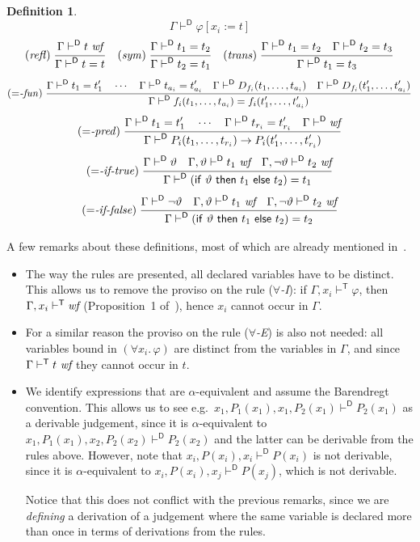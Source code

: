 \documentclass{article}
\newtheorem{definition}{Definition}[section]
\newcommand{\ifthelse}[3]{\ensuremath{\mathsf{if}\ {#1}\ \mathsf{then}\ {#2}\ \mathsf{else}\ {#3}}}
\newcommand{\ok}{\mbox{\em wf}}
\newcommand{\wf}{\ \mbox{\em wf}}
\newcommand{\myvdash}[1]{\ensuremath{\vdash^{\mathsf{#1}}}}
\def\namerule#1{({\it #1\/})}
\def\rulexn#1#2#3{\makebox[0pt][r]{\hss\namerule{#1}$\;\;$}\frac{\displaystyle\strut #2}{\displaystyle\strut #3}}
\def\rulexn#1#2#3{\mbox{\namerule{#1}}\;\frac{\displaystyle\strut #2}{\displaystyle\strut #3}}
\def\sep{.\,}
\begin{document}
\begin{definition}
$$   {\Gamma\myvdash{D}\varphi[x_i:=t]}$$
$$\rulexn{refl}{\Gamma\myvdash{D}t\wf}{\Gamma\myvdash{D}t=t}
\quad
\rulexn{sym}{\Gamma\myvdash{D}t_1=t_2}{\Gamma\myvdash{D}t_2=t_1}
\quad
\rulexn{trans}{\Gamma\myvdash{D}t_1=t_2 \quad \Gamma\myvdash{D}t_2=t_3}
              {\Gamma\myvdash{D}t_1=t_3}$$
$$\rulexn{$=$-fun}
   {\Gamma\myvdash{D}t_1=t'_1 \quad \cdots \quad
    \Gamma\myvdash{D}t_{a_i}=t'_{a_i} \quad
    \Gamma\myvdash{D}D_{f_i}(t_1,\ldots,t_{a_i}) \quad 
    \Gamma\myvdash{D}D_{f_i}(t'_1,\ldots,t'_{a_i})}
   {\Gamma\myvdash{D}f_i(t_1,\ldots,t_{a_i})=f_i(t'_1,\ldots,t'_{a_i})}$$
$$\rulexn{$=$-pred}
   {\Gamma\myvdash{D}t_1=t'_1\quad\cdots\quad\Gamma\myvdash{D}t_{r_i}=t'_{r_i}
                             \quad \Gamma\myvdash{D}\ok}
   {\Gamma\myvdash{D}P_i(t_1,\ldots, t_{r_i}) \to P_i(t'_1,\ldots, t'_{r_i})}$$
$$\rulexn{$=$-if-true}
   {\Gamma\myvdash{D}\vartheta \quad \Gamma,\vartheta\myvdash{D}t_1\wf
                          \quad \Gamma,\neg\vartheta\myvdash{D}t_2\wf}
   {\Gamma\myvdash{D}(\ifthelse\vartheta{t_1}{t_2})=t_1}$$
$$\rulexn{$=$-if-false}
   {\Gamma\myvdash{D}\neg\vartheta \quad \Gamma,\vartheta\myvdash{D}t_1\wf
                              \quad \Gamma,\neg\vartheta\myvdash{D}t_2\wf}
   {\Gamma\myvdash{D}(\ifthelse\vartheta{t_1}{t_2})=t_2}$$
\end{definition}

\bigskip\noindent
A few remarks about these definitions, most of which are already mentioned
in~\cite{wie:zwa:03}.
\begin{itemize}
\item The way the rules are presented, all declared variables have to
be distinct.  This allows us to remove the proviso on the rule
(\emph{$\forall$-I}): if $\Gamma,x_i\myvdash{T}\varphi$, then
$\Gamma,x_i\myvdash{T}\ok$ (Proposition~1 of~\cite{wie:zwa:03}),
hence $x_i$ cannot occur in $\Gamma$.
\item For a similar reason the proviso on the rule (\emph{$\forall$-E})
is also not needed: all variables bound in $(\forall x_i\sep\varphi)$
are distinct from the variables in $\Gamma$, and since
$\Gamma\myvdash{T}t\wf$ they cannot occur in $t$.
\item We identify expressions that are $\alpha$-equivalent and
assume the Barendregt convention.  This allows us to see e.g.\ 
$x_1,P_1(x_1),x_1,P_2(x_1)\myvdash{D}P_2(x_1)$ as a derivable judgement,
since it is $\alpha$-equivalent to
$x_1,P_1(x_1),x_2,P_2(x_2)\myvdash{D}P_2(x_2)$ and the latter can be
derivable from the rules above.  However, note that
$x_i,P(x_i),x_i\myvdash{D}P(x_i)$ is not derivable, since it is
$\alpha$-equivalent to
$x_i,P(x_i),x_j\myvdash{D}P(x_j)$, which is not derivable.

Notice that this does not conflict with the previous remarks, since we
are \emph{defining} a derivation of a judgement where the same variable
is declared more than once in terms of derivations from the rules.
\end{itemize}
\end{document}
